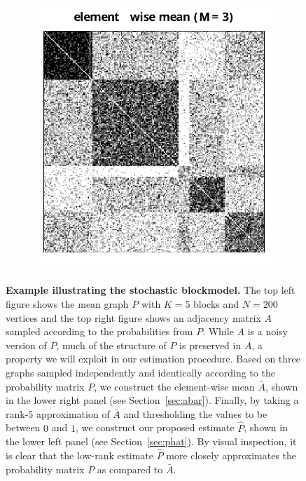 \documentclass[10pt,letterpaper]{article}
\renewcommand{\hat}{\widehat}
\begin{document}
\begin{figure}
\begin{subfigure}{.4\textwidth}
\end{subfigure}%
\begin{subfigure}{.4\textwidth}
  \centering
  \includegraphics[width=\linewidth]{SBM_Abar.pdf}
\end{subfigure}
\caption{{\bf Example illustrating the stochastic blockmodel.}
The top left figure shows the mean graph $P$ with $K = 5$ blocks and $N=200$ vertices and the top right figure shows an adjacency matrix $A$ sampled according to the probabilities from $P$.
While $A$ is a noisy version of $P$, much of the structure of $P$ is preserved in $A$, a property we will exploit in our estimation procedure.
Based on three graphs sampled independently and identically according to the probability matrix $P$, we construct the element-wise mean $\bar{A}$, shown in the lower right panel (see Section~\ref{sec:abar}).  
Finally, by taking a rank-5 approximation of $\bar{A}$ and thresholding the values to be between $0$ and $1$, we construct our proposed estimate $\hat{P}$, shown in the lower left panel (see Section~\ref{sec:phat}).
By visual inspection, it is clear that the low-rank estimate $\hat{P}$ more closely approximates the probability matrix $P$ as compared to $\bar{A}$.
}
\label{fig:SBM_example}
\end{figure}
\end{document}

